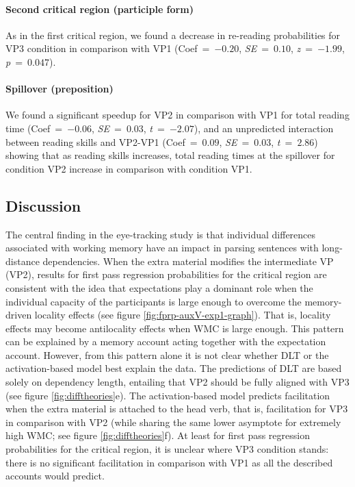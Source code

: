 \documentclass{frontiersSCNS}\usepackage{knitr}
\begin{document}
\paragraph{Second critical region (participle form)} As in the first critical region, we found a decrease in re-reading probabilities for VP3 condition in comparison with  VP1 (\mbox{Coef = $-0.20$}, \mbox{\textit{SE} = $0.10$}, \mbox{\textit{z} = $-1.99$}, \mbox{\textit{p} = $0.047$}).

 \paragraph{Spillover (preposition)}
 We found a significant speedup for VP2 in comparison with VP1 for total reading time (\mbox{Coef = $-0.06$}, \mbox{\textit{SE} = $0.03$}, \mbox{\textit{t} = $-2.07$}), and an 
unpredicted interaction between reading skills and VP2-VP1 (\mbox{Coef = $0.09$}, \mbox{\textit{SE} = $0.03$}, \mbox{\textit{t} = $2.86$}) showing that as reading skills increases, total reading times at the spillover for condition VP2 increase in comparison with condition VP1.
 

 
\subsection{Discussion}


The central finding in the eye-tracking study is that individual differences associated with working memory have an impact in parsing sentences with long-distance dependencies. When the extra material modifies the intermediate VP (VP2), results for first pass regression probabilities for the critical region are consistent with the idea that expectations play a dominant role when the individual capacity of the participants is large enough to overcome the memory-driven locality effects (see figure \ref{fig:fprp-auxV-exp1-graph}). That is, locality effects may become antilocality effects when WMC is large enough. This pattern can be explained by a memory account acting together with the
expectation account. However, from this pattern alone it is not clear whether DLT or the activation-based model best explain  the data. The predictions of DLT are based solely on dependency length, entailing that VP2 should be fully aligned with VP3 (see figure \ref{fig:difftheories}e). The activation-based model predicts facilitation when the extra material is attached to the head verb, that is, facilitation for VP3 in comparison with VP2 (while sharing the same lower asymptote for extremely high WMC; see figure \ref{fig:difftheories}f). At least for first pass regression probabilities for the critical region, it is unclear where VP3 condition stands: there is no significant facilitation in comparison with VP1 as all the described accounts would predict.
\end{document}
